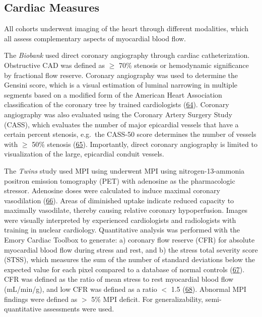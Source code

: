 \documentclass[
  11pt,
  openany]{book}
\begin{document}
\hypertarget{cardiac-measures}{%
\subsection{Cardiac Measures}\label{cardiac-measures}}

All cohorts underwent imaging of the heart through different modalities, which all assess complementary aspects of myocardial blood flow.

The \emph{Biobank} used direct coronary angiography through cardiac catheterization.
Obstructive CAD was defined as \(\ge\) 70\% stenosis or hemodynamic significance by fractional flow reserve.
Coronary angiography was used to determine the Gensini score, which is a visual estimation of luminal narrowing in multiple segments based on a modified form of the American Heart Association classification of the coronary tree by trained cardiologists (\protect\hyperlink{ref-Gensini1983}{64}).
Coronary angiography was also evaluated using the Coronary Artery Surgery Study (CASS), which evaluates the number of major epicardial vessels that have a certain percent stenosis, e.g.~the CASS-50 score determines the number of vessels with \(\ge\) 50\% stenosis (\protect\hyperlink{ref-Ringqvist1983}{65}).
Importantly, direct coronary angiography is limited to visualization of the large, epicardial conduit vessels.

The \emph{Twins} study used MPI using underwent MPI using nitrogen-13-ammonia positron emission tomography (PET) with adenosine as the pharmacologic stressor.
Adenosine doses were calculated to induce maximal coronary vasodilation (\protect\hyperlink{ref-Vaccarino2011}{66}).
Areas of diminished uptake indicate reduced capacity to maximally vasodilate, thereby causing relative coronary hypoperfusion.
Images were visually interpreted by experienced cardiologists and radiologists with training in nuclear cardiology.
Quantitative analysis was performed with the Emory Cardiac Toolbox to generate: a) coronary flow reserve (CFR) for absolute myocardial blood flow during stress and rest, and b) the stress total severity score (STSS), which measures the sum of the number of standard deviations below the expected value for each pixel compared to a database of normal controls (\protect\hyperlink{ref-Hutchins1990}{67}).
CFR was defined as the ratio of mean stress to rest myocardial blood flow (mL/min/g), and low CFR was defined as a ratio \(<\) 1.5 (\protect\hyperlink{ref-Gould2018a}{68}).
Abnormal MPI findings were defined as \(>\) 5\% MPI deficit.
For generalizability, semi-quantitative assessments were used.
\end{document}
